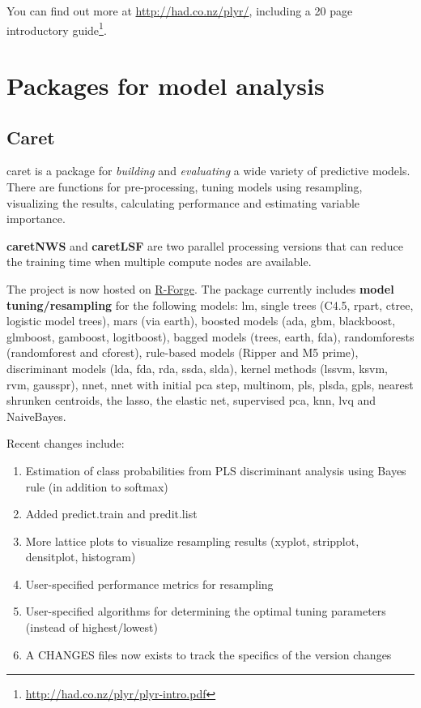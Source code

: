 You can find out more at \url{http://had.co.nz/plyr/}, including a 20
page introductory guide\footnote{\url{http://had.co.nz/plyr/plyr-intro.pdf}}.


\section{Packages for model analysis}
\label{sec:pack-model-analys}

\subsection{Caret}
\label{sec:caret}

caret is a package for {\it building} and {\it evaluating} a wide
variety of predictive models. There are functions for pre-processing,
tuning models using resampling, visualizing the results, calculating
performance and estimating variable importance. 

{\bf caretNWS} and {\bf caretLSF} are two parallel processing versions
that can reduce the training time when multiple compute nodes are
available.

The project is now hosted on
\href{http://caret.r-forge.r-project.org/}{R-Forge}.  The package
currently includes {\bf model tuning/resampling} for the following
models: lm, single trees (C4.5, rpart, ctree, logistic model trees),
mars (via earth), boosted models (ada, gbm, blackboost, glmboost,
gamboost, logitboost), bagged models (trees, earth, fda),
randomforests (randomforest and cforest), rule-based models (Ripper
and M5 prime), discriminant models (lda, fda, rda, ssda, slda), kernel
methods (lssvm, ksvm, rvm, gausspr), nnet, nnet with initial pca step,
multinom, pls, plsda, gpls, nearest shrunken centroids, the lasso, the
elastic net, supervised pca, knn, lvq and NaiveBayes.

Recent changes include:
\begin{enumerate}
\item Estimation of class probabilities from PLS discriminant analysis
  using Bayes rule (in addition to softmax)
\item Added predict.train and predit.list

\item More lattice plots to visualize resampling results (xyplot,
  stripplot, densitplot, histogram) 

\item User-specified performance metrics for resampling

\item User-specified algorithms for determining the optimal tuning
  parameters (instead of highest/lowest)

\item A CHANGES files now exists to track the specifics of the version
  changes 
\end{enumerate}

